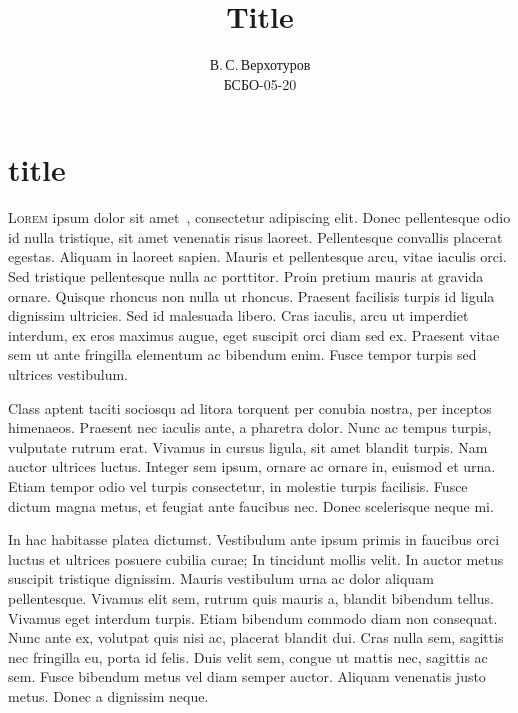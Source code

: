\documentclass[14pt, a4paper, titlepage]{extarticle}
\title{Title}
\author{В.\,С.\,Верхотуров \\ БСБО-05-20}
\affil{РТУ МИРЭА}
\begin{document}
\maketitle


\section{title}

\lettrine{L}{orem} ipsum dolor sit amet~\cite{texbook}, consectetur adipiscing elit. Donec pellentesque odio id nulla tristique, sit amet venenatis risus laoreet. Pellentesque convallis placerat egestas. Aliquam in laoreet sapien. Mauris et pellentesque arcu, vitae iaculis orci. Sed tristique pellentesque nulla ac porttitor. Proin pretium mauris at gravida ornare. Quisque rhoncus non nulla ut rhoncus. Praesent facilisis turpis id ligula dignissim ultricies. Sed id malesuada libero. Cras iaculis, arcu ut imperdiet interdum, ex eros maximus augue, eget suscipit orci diam sed ex. Praesent vitae sem ut ante fringilla elementum ac bibendum enim. Fusce tempor turpis sed ultrices vestibulum.

Class aptent taciti sociosqu ad litora torquent per conubia nostra, per inceptos himenaeos. Praesent nec iaculis ante, a pharetra dolor. Nunc ac tempus turpis, vulputate rutrum erat. Vivamus in cursus ligula, sit amet blandit turpis. Nam auctor ultrices luctus. Integer sem ipsum, ornare ac ornare in, euismod et urna. Etiam tempor odio vel turpis consectetur, in molestie turpis facilisis. Fusce dictum magna metus, et feugiat ante faucibus nec. Donec scelerisque neque mi.

In hac habitasse platea dictumst. Vestibulum ante ipsum primis in faucibus orci luctus et ultrices posuere cubilia curae; In tincidunt mollis velit. In auctor metus suscipit tristique dignissim. Mauris vestibulum urna ac dolor aliquam pellentesque. Vivamus elit sem, rutrum quis mauris a, blandit bibendum tellus. Vivamus eget interdum turpis. Etiam bibendum commodo diam non consequat. Nunc ante ex, volutpat quis nisi ac, placerat blandit dui. Cras nulla sem, sagittis nec fringilla eu, porta id felis. Duis velit sem, congue ut mattis nec, sagittis ac sem. Fusce bibendum metus vel diam semper auctor. Aliquam venenatis justo metus. Donec a dignissim neque.

\printbibliography
\end{document}
